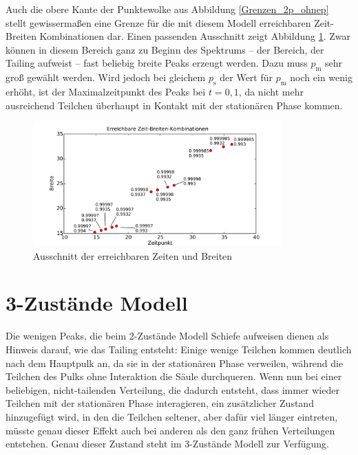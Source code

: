 Auch die obere Kante der Punktewolke aus Abbildung \ref{Grenzen_2p_ohnep} stellt gewissermaßen eine Grenze für die mit diesem Modell erreichbaren Zeit-Breiten Kombinationen dar. 
Einen passenden Ausschnitt zeigt Abbildung \ref{Grenzen_2p_ausschnitt_o}. Zwar können in diesem Bereich ganz zu Beginn des Spektrums -- der Bereich, der Tailing aufweist -- fast beliebig breite Peaks erzeugt werden. Dazu muss $p_{\text{m}}$ sehr groß gewählt werden. Wird jedoch bei gleichem $p_{\text{s}}$ der Wert für $p_{\text{m}}$ noch ein wenig erhöht, ist der Maximalzeitpunkt des Peaks bei $t=0,1$, da nicht mehr ausreichend Teilchen überhaupt in Kontakt mit der stationären Phase kommen.

\begin{figure}[h]
\centering
\includegraphics[width=0.85\textwidth]{bilder/2s_zeitbreiten_ausschnitt_o.pdf}
\caption{Ausschnitt der erreichbaren Zeiten und Breiten}
\label{Grenzen_2p_ausschnitt_o}
\end{figure}

\section{3-Zustände Modell}
Die wenigen Peaks, die beim 2-Zustände Modell Schiefe aufweisen dienen als Hinweis darauf, wie das Tailing entsteht: Einige wenige Teilchen kommen deutlich nach dem Hauptpulk an, da sie in der stationären Phase verweilen, während die Teilchen des Pulks ohne Interaktion die Säule durchqueren. 
Wenn nun bei einer beliebigen, nicht-tailenden Verteilung, die dadurch entsteht, dass immer wieder Teilchen mit der stationären Phase interagieren, ein zusätzlicher Zustand hinzugefügt wird, in den die Teilchen seltener, aber dafür viel länger eintreten, müsste genau dieser Effekt auch bei anderen als den ganz frühen Verteilungen entstehen.
Genau dieser Zustand steht im 3-Zustände Modell zur Verfügung. 

